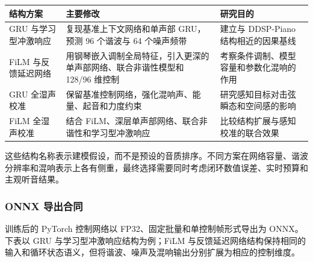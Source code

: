 \begin{longtable}[]{@{}
  >{\raggedright\arraybackslash}p{}
  >{\raggedright\arraybackslash}p{}
  >{\raggedright\arraybackslash}p{}@{}}
\toprule\noalign{}
\begin{minipage}[b]{\linewidth}\raggedright
结构方案
\end{minipage} & \begin{minipage}[b]{\linewidth}\raggedright
主要修改
\end{minipage} & \begin{minipage}[b]{\linewidth}\raggedright
研究目的
\end{minipage} \\
\midrule\noalign{}
\endhead
\bottomrule\noalign{}
\endlastfoot
GRU 与学习型冲激响应 & 复现基准上下文网络和单声部 GRU，预测 96 个谐波与
64 个噪声频带 & 建立与 DDSP-Piano 结构相近的因果基线 \\
FiLM 与反馈延迟网络 &
用钢琴嵌入调制全局特征，引入更深的单声部网络、联合非谐性模型和 128/96
维控制 & 考察条件调制、模型容量和参数化混响的作用 \\
GRU 全湿声校准 & 保留基准控制网络，强化混响声、能量、起音和力度约束 &
研究感知目标对击弦瞬态和空间感的影响 \\
FiLM 全湿声校准 & 结合 FiLM、深层单声部网络、联合非谐性和学习型冲激响应
& 比较结构扩展与感知校准的联合效果 \\
\end{longtable}

这些结构名称表示建模假设，而不是预设的音质排序。不同方案在网络容量、谐波分辨率和混响表示上各有侧重，最终选择需要同时考虑闭环数值误差、实时预算和主观听音结果。

\subsubsection{ONNX
导出合同}\label{src-experiment-case3-piano-ddsp-onnx}

训练后的 PyTorch 控制网络以 FP32、固定批量和单控制帧形式导出为
ONNX。下表以 GRU 与学习型冲激响应结构为例；FiLM
与反馈延迟网络结构保持相同的输入和循环状态语义，但将谐波、噪声及混响输出分别扩展为相应的控制维度。

